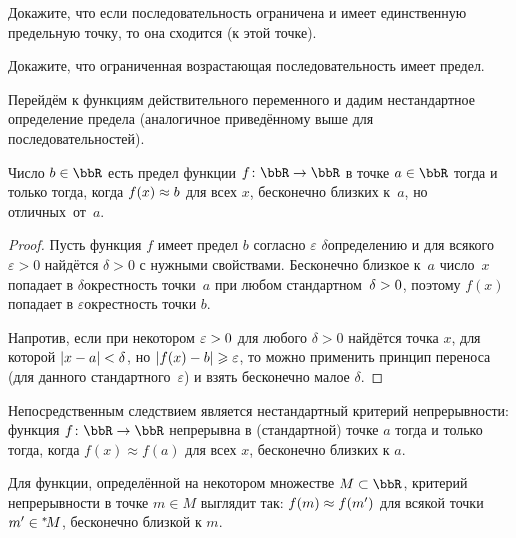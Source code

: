 \begin{problem}
Докажите, что если последовательность ограничена и имеет
единственную предельную точку, то она сходится (к этой точке).
\end{problem}

\begin{problem}
Докажите, что ограниченная возрастающая последовательность имеет
предел.
\end{problem}

\medskip

Перейдём к функциям действительного переменного и дадим
не\-стан\-дарт\-ное определение предела (аналогичное приведённому
выше для последовательностей).

\begin{theorem}
Число $b\in\bbR$ есть предел функции%
%
$f\colon \bbR\hm\to \bbR$ в
точке $a\hm\in\bbR$ тогда и только тогда, когда $f(x)\hm\approx
b$ для всех $x$, бесконечно близких к~$a$, но
отличных~от~$a$.
\end{theorem}

\begin{proof}
Пусть функция $f$ имеет предел $b$ согласно $\varepsilon$\д
$\delta$\д определению и для всякого $\varepsilon>0$ найдётся
$\delta>0$ с нужными свойствами. Бесконечно близкое к~$a$
число~$x$ попадает в $\delta$\д окрестность точки~$a$ при любом
стандартном~$\delta\hm>0$, поэтому $f(x)$ попадает в
$\varepsilon$\д окрестность точки $b$.

Напротив, если при некотором $\varepsilon\hm>0$ для любого
$\delta>0$ найдётся точка $x$, для которой $|x-a|\hm<\delta$, но
$|f(x)-b|\hm\ge\varepsilon$, то можно применить принцип переноса
(для данного стандартного~$\varepsilon$) и взять бесконечно
малое $\delta$.
\end{proof}

Непосредственным следствием является нестандартный критерий
непрерывности: функция $f\colon \bbR\to \bbR$ непрерывна%
%
в (стандартной) точке $a$ тогда и только тогда, когда $f(x)\approx
f(a)$ для всех $x$, бесконечно близких к $a$.

Для функции, определённой на некотором множестве
$M\hm\subset\bbR$, критерий непрерывности в точке $m\in M$
выглядит так: $f(m)\hm\approx f(m')$ для всякой точки
$m'\hm\in\nst{M}$, бесконечно близкой к $m$.

